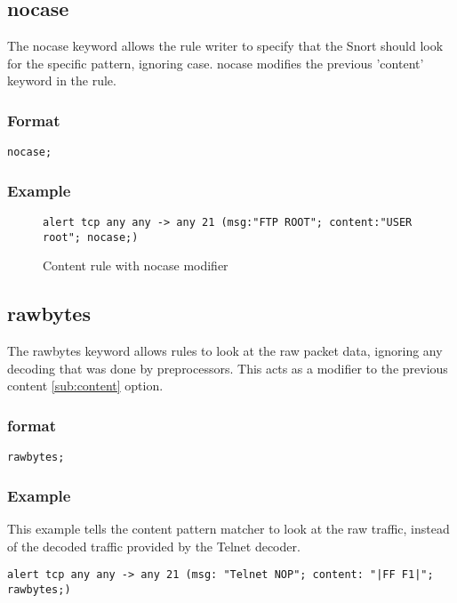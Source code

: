 \documentclass[english]{report}
\begin{document}
\subsection{nocase\label{sub:nocase}}

The nocase keyword allows the rule writer to specify that the Snort should look
for the specific pattern, ignoring case.  nocase modifies the previous 'content' keyword in the rule.

\subsubsection{Format}

\begin{verbatim}
nocase;
\end{verbatim}

\subsubsection{Example}
\begin{figure}[!hbpt]
\begin{verbatim}
alert tcp any any -> any 21 (msg:"FTP ROOT"; content:"USER root"; nocase;)
\end{verbatim}

\caption{\label{content nocase mod example}Content rule with nocase modifier}
\end{figure}

\subsection{rawbytes \label{sub:rawbytes}}

The rawbytes keyword allows rules to look at the raw packet data, ignoring any
decoding that was done by preprocessors.  This acts as a modifier to the
previous content \ref{sub:content} option. 

\subsubsection{format}

\begin{verbatim}
rawbytes;
\end{verbatim}

\subsubsection{Example}

This example tells the content pattern matcher to look at the raw traffic,
instead of the decoded traffic provided by the Telnet decoder.
\begin{verbatim}
alert tcp any any -> any 21 (msg: "Telnet NOP"; content: "|FF F1|"; rawbytes;)
\end{verbatim}
\end{document}
